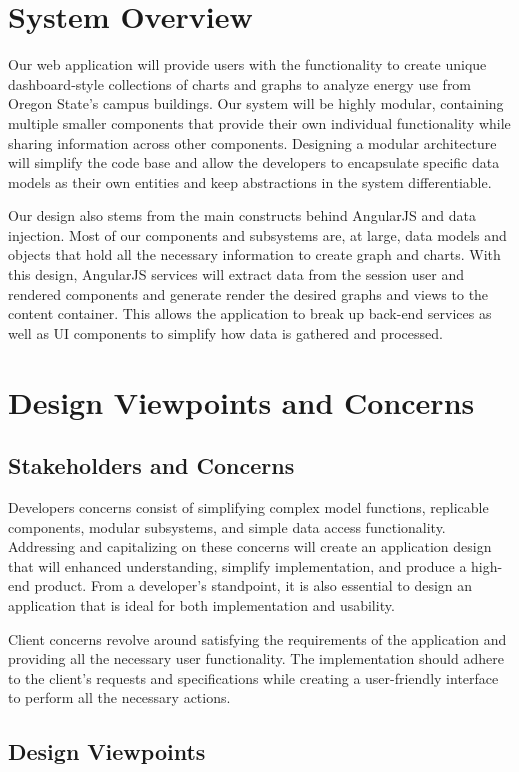 \documentclass[journal,10pt,onecolumn,compsoc]{IEEEtran}
\begin{document}
    \section{System Overview} 
    Our web application will provide users with the functionality to create unique dashboard-style collections of charts and graphs to analyze energy use from Oregon State's campus buildings. Our system will be highly modular, containing multiple smaller components that provide their own individual functionality while sharing information across other components. Designing a modular architecture will simplify the code base and allow the developers to encapsulate specific data models as their own entities and keep abstractions in the system differentiable.
    
    \noindent Our design also stems from the main constructs behind AngularJS and data injection. Most of our components and subsystems are, at large, data models and objects that hold all the necessary information to create graph and charts. With this design, AngularJS services will extract data from the session user and rendered components and generate render the desired graphs and views to the content container. This allows the application to break up back-end services as well as UI components to simplify how data is gathered and processed.
    \section{Design Viewpoints and Concerns}
    \subsection{Stakeholders and Concerns}
    Developers concerns consist of simplifying complex model functions, replicable components, modular subsystems, and simple data access functionality. Addressing and capitalizing on these concerns will create an application design that will enhanced understanding, simplify implementation, and produce a high-end product. From a developer's standpoint, it is also essential to design an application that is ideal for both implementation and usability.

    \noindent Client concerns revolve around satisfying the requirements of the application and providing all the necessary user functionality. The implementation should adhere to the client's requests and specifications while creating a user-friendly interface to perform all the necessary actions.
    \subsection{Design Viewpoints}
\end{document}

